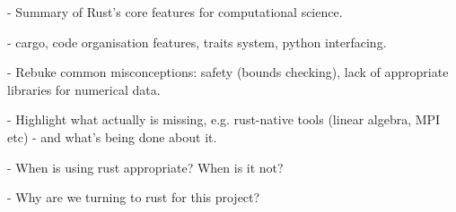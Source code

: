 - Summary of Rust's core features for computational science.

- cargo, code organisation features, traits system, python interfacing.

- Rebuke common misconceptions: safety (bounds checking), lack of appropriate libraries for numerical data.

- Highlight what actually is missing, e.g. rust-native tools (linear algebra, MPI etc) - and what's being done about it.

- When is using rust appropriate? When is it not?

- Why are we turning to rust for this project?
